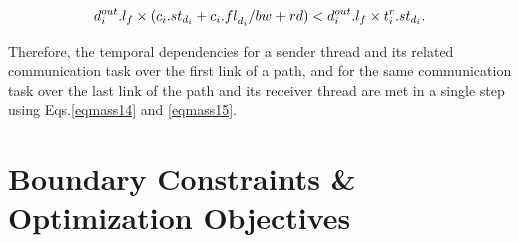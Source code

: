     \begin{equation}
    	\begin{split}
    d^{out}_i. l_{f} \times ({c_i}.{st}_{d_i} + {c_i}.{fl}_{d_i}/bw + rd) < d^{out}_i. l_{f} \times {t_i^{r}}.{st}_{d_i}\raisetag{1.8\baselineskip}.
    \label{eqmass15}
    	\end{split}
    \end{equation}\newline
    
    
    Therefore, the temporal dependencies for a sender thread and its related communication task over the first link of a path, and for the same communication task over the last link of the path and its receiver thread are met in a single step using Eqs.\eqref{eqmass14} and \eqref{eqmass15}.   
    


    \section{Boundary Constraints \& Optimization Objectives}\label{opt_goals}
    
